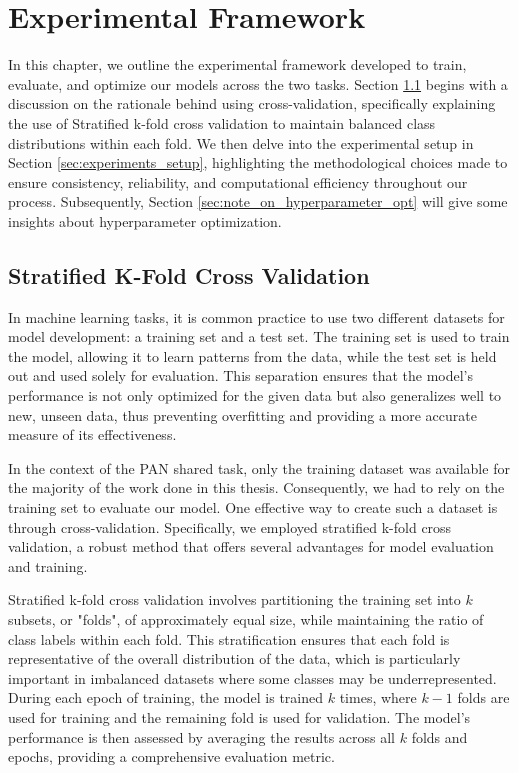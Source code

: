\documentclass{Configuration_Files/PoliMi3i_thesis}
\begin{document}

\chapter{Experimental Framework} \label{chap:system_overview}
In this chapter, we outline the experimental framework developed to train, evaluate, and optimize our models across the two tasks. Section \ref{sec:strat_k_cross} begins with a discussion on the rationale behind using cross-validation, specifically explaining the use of Stratified k-fold cross validation to maintain balanced class distributions within each fold. We then delve into the experimental setup in Section \ref{sec:experiments_setup}, highlighting the methodological choices made to ensure consistency, reliability, and computational efficiency throughout our process. Subsequently, Section \ref{sec:note_on_hyperparameter_opt} will give some insights about hyperparameter optimization.

\section{Stratified K-Fold Cross Validation} \label{sec:strat_k_cross}
In machine learning tasks, it is common practice to use two different datasets for model development: a training set and a test set. The training set is used to train the model, allowing it to learn patterns from the data, while the test set is held out and used solely for evaluation. This separation ensures that the model's performance is not only optimized for the given data but also generalizes well to new, unseen data, thus preventing overfitting and providing a more accurate measure of its effectiveness.

In the context of the PAN shared task, only the training dataset was available for the majority of the work done in this thesis. Consequently, we had to rely on the training set to evaluate our model. One effective way to create such a dataset is through cross-validation. Specifically, we employed stratified k-fold cross validation, a robust method that offers several advantages for model evaluation and training.

Stratified k-fold cross validation involves partitioning the training set into $k$ subsets, or "folds", of approximately equal size, while maintaining the ratio of class labels within each fold. This stratification ensures that each fold is representative of the overall distribution of the data, which is particularly important in imbalanced datasets where some classes may be underrepresented. During each epoch of training, the model is trained $k$ times, where $k-1$ folds are used for training and the remaining fold is used for validation. The model's performance is then assessed by averaging the results across all $k$ folds and epochs, providing a comprehensive evaluation metric.
\end{document}
